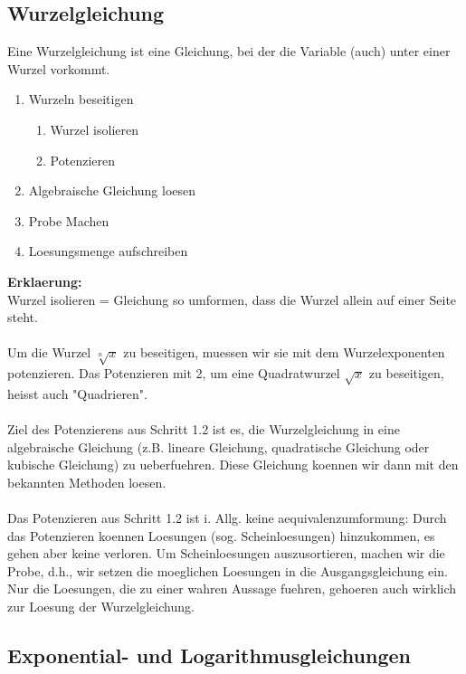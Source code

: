 \begin{multicols}{2}
    \subsection{Wurzelgleichung}
    \vspace{-4mm}
    Eine Wurzelgleichung ist eine Gleichung, bei der die Variable (auch) unter einer Wurzel vorkommt. \\
    \begin{enumerate}
        \item Wurzeln beseitigen
              \begin{enumerate}
                  \item Wurzel isolieren
                  \item Potenzieren
              \end{enumerate}
        \item Algebraische Gleichung loesen
        \item Probe Machen
        \item Loesungsmenge aufschreiben
    \end{enumerate}
    \textbf{Erklaerung:} \\
    Wurzel isolieren = Gleichung so umformen, dass die Wurzel allein auf einer Seite steht. \\~\\
    Um die Wurzel $\sqrt[n]{x}$ zu beseitigen, muessen wir sie mit dem Wurzelexponenten potenzieren. Das Potenzieren mit 2, um eine Quadratwurzel $\sqrt{x}$ zu beseitigen, heisst auch "Quadrieren". \\~\\
    Ziel des Potenzierens aus Schritt 1.2 ist es, die Wurzelgleichung in eine algebraische Gleichung (z.B. lineare Gleichung, quadratische Gleichung oder kubische Gleichung) zu ueberfuehren. Diese Gleichung koennen wir dann mit den bekannten Methoden loesen. \\~\\
    Das Potenzieren aus Schritt 1.2 ist i. Allg. keine aequivalenzumformung: Durch das Potenzieren koennen Loesungen (sog. Scheinloesungen) hinzukommen, es gehen aber keine verloren.
    Um Scheinloesungen auszusortieren, machen wir die Probe, d.h., wir setzen die moeglichen Loesungen in die Ausgangsgleichung ein. Nur die Loesungen, die zu einer wahren Aussage fuehren, gehoeren auch wirklich zur Loesung der Wurzelgleichung.


    \subsection{Exponential- und Logarithmusgleichungen}
    \vspace{-4mm}

\end{multicols}

